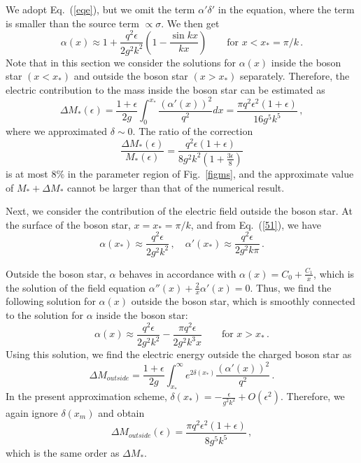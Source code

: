 \documentclass[
aps,prd,
12pt,%
nopreprintnumbers,
showpacs,
eqsecnum,
nofootinbib
]{revtex4-1}
\begin{document}
We adopt Eq.~(\ref{eqe}), but we omit the term $\alpha'\delta'$ in the
equation, where the term is smaller than the source term $\propto \sigma$. We
then get
\begin{equation}
\alpha(x)\approx 1+\frac{q^2\epsilon}{2g^2k^2}\left(1-\frac{\sin kx}{kx}\right)
\qquad\mbox{for } x<x_*=\pi/k\,.
\label{51}
\end{equation}
Note that in this section we consider the solutions for $\alpha(x)$ inside the
boson star $(x<x_*)$ and outside the boson star $(x>x_*)$ separately. Therefore,
the electric contribution to the mass inside the boson star can be estimated as
\begin{equation}
\Delta
M_*(\epsilon)=\frac{1+\epsilon}{2g}\int_0^{x_*}\frac{(\alpha'(x))^2}{q^2}dx=\frac{\pi
q^2\epsilon^2(1+\epsilon)}{16g^5k^5}\,,
\end{equation}
where we approximated $\delta\sim 0$.
The ratio of the correction
\begin{equation}
\frac{\Delta
M_*(\epsilon)}{M_*(\epsilon)}=\frac{
q^2\epsilon(1+\epsilon)}{8g^2k^2\left(1+\frac{3\epsilon}{8}\right)}
\end{equation}
is at most $8\%$ in the parameter region of Fig.~\ref{figms}, and the
approximate value of $M_*+\Delta M_*$ cannot be larger than that of the numerical
result.

Next, we consider the contribution of the electric field outside the boson star.
At the surface of the boson star, $x=x_*=\pi/k$, and from Eq.~(\ref{51}), we have
\begin{equation}
\alpha(x_*)\approx\frac{q^2\epsilon}{2g^2k^2}\,,
\quad\alpha'(x_*)\approx\frac{
q^2\epsilon}{2g^2k\pi}\,.
\end{equation}

Outside the boson star, $\alpha$ behaves in
accordance with $\alpha(x)=C_0+\frac{C_1}{x}$, which is the solution of the field
equation $\alpha''(x)+\frac{2}{x}\alpha'(x)=0$. Thus, we find the following
solution for $\alpha(x)$ outside the boson star, which is smoothly connected to
the solution for $\alpha$ inside the boson star:
\begin{equation}
\alpha(x)\approx\frac{q^2\epsilon}{2g^2k^2}-\frac{\pi
q^2\epsilon}{2g^2k^3x}\qquad\mbox{for }x>x_*\,.
\end{equation}
Using this solution, we find the electric energy outside the charged boson star
as
\begin{equation}
\Delta M_{outside}=\frac{1+\epsilon}{2g}\int_{x_*}^\infty
e^{2\delta(x_*)}\frac{(\alpha'(x))^2}{q^2}\,.
\end{equation}
In the present approximation scheme,
$\delta(x_*)=-\frac{\epsilon}{g^2k^2}+O(\epsilon^2)$. Therefore, we again ignore
$\delta(x_m)$ and obtain
\begin{equation}
\Delta M_{outside}(\epsilon)=\frac{\pi q^2\epsilon^2
(1+\epsilon)}{8g^5k^5}\,,
\end{equation}
which is the same order as $\Delta M_*$.
\end{document}
